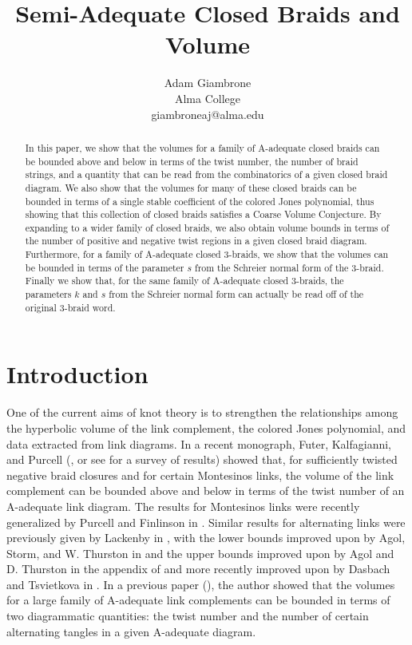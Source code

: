 \documentclass{article}
\begin{document}
\title{Semi-Adequate Closed Braids and Volume}
\author{Adam Giambrone\\ Alma College\\ giambroneaj@alma.edu}
\date{}
\maketitle

\begin{abstract}


In this paper, we show that the volumes for a family of A-adequate closed braids can be bounded above and below in terms of the twist number, the number of braid strings, and a quantity that can be read from the combinatorics of a given closed braid diagram. We also show that the volumes for many of these closed braids can be bounded in terms of a single stable coefficient of the colored Jones polynomial, thus showing that this collection of closed braids satisfies a Coarse Volume Conjecture. By expanding to a wider family of closed braids, we also obtain volume bounds in terms of the number of positive and negative twist regions in a given closed braid diagram. Furthermore, for a family of A-adequate closed $3$-braids, we show that the volumes can be bounded in terms of the parameter $s$ from the Schreier normal form of the $3$-braid. Finally we show that, for the same family of A-adequate closed 3-braids, the parameters $k$ and $s$ from the Schreier normal form can actually be read off of the original 3-braid word. 

\end{abstract}

\section{Introduction}

One of the current aims of knot theory is to strengthen the relationships among the hyperbolic volume of the link complement, the colored Jones polynomial, and data extracted from link diagrams. In a recent monograph, Futer, Kalfagianni, and Purcell (\cite{Guts}, or see \cite{Survey} for a survey of results) showed that, for sufficiently twisted negative braid closures and for certain Montesinos links, the volume of the link complement can be bounded above and below in terms of the twist number of an A-adequate link diagram. The results for Montesinos links were recently generalized by Purcell and Finlinson in \cite{Montesinos}. Similar results for alternating links were previously given by Lackenby in \cite{Lackenby}, with the lower bounds improved upon by Agol, Storm, and W. Thurston in \cite{AgolStorm} and the upper bounds improved upon by Agol and D. Thurston in the appendix of \cite{Lackenby} and more recently improved upon by Dasbach and Tsvietkova in \cite{Refined}. In a previous paper (\cite{Me}), the author showed that the volumes for a large family of A-adequate link complements can be bounded in terms of two diagrammatic quantities: the twist number and the number of certain alternating tangles in a given A-adequate diagram. 
\end{document}
